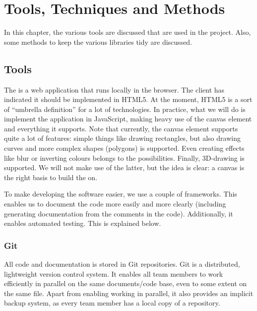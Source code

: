 \chapter{Tools, Techniques and Methods}
\label{chap:tools}
In this chapter, the various tools are discussed that are used in the \projectname{} project. Also, some methods to keep the various libraries tidy are discussed.

\section{Tools}
\label{sec:tools}
The \applicationname{} is a web application that runs locally in the browser. The client has indicated it should be implemented in HTML5. At the moment, HTML5 is a sort of ``umbrella definition'' for a lot of technologies. In practice, what we will do is implement the application in JavaScript, making heavy use of the canvas element and everything it supports. Note that currently, the canvas element supports quite a lot of features: simple things like drawing rectangles, but also drawing curves and more complex shapes (polygons) is supported. Even creating effects like blur or inverting colours belongs to the possibilities. Finally, 3D-drawing is supported. We will not make use of the latter, but the idea is clear: a canvas is the right basis to build the \applicationname{} on.

To make developing the software easier, we use a couple of frameworks. This enables us to document the code more easily and more clearly (including generating documentation from the comments in the code). Additionally, it enables automated testing. This is explained below.

\subsection{Git}
\label{subsec:tools-git}
All code and documentation is stored in Git repositories. Git is a distributed, lightweight version control system. It enables all team members to work efficiently in parallel on the same documents/code base, even to some extent on the same file. Apart from enabling working in parallel, it also provides an implicit backup system, as every team member has a local copy of a repository.

